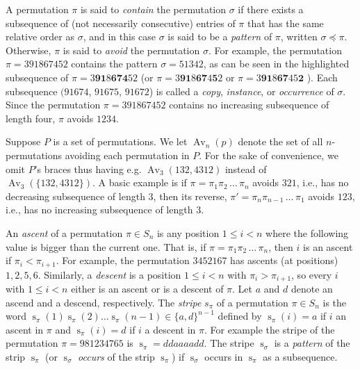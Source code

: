 \documentclass[a4paper]{llncs}
\DeclareMathOperator{\AV}{Av}
\DeclareMathOperator{\stripea}{s}
\newcommand{\stripe}[2]{\stripea_{{#1}}({#2})}
\newcommand{\stripew}[1]{\stripea_{{#1}}}
\newcommand{\dstep}{d}
\newcommand{\ustep}{a}
\begin{document}
A permutation $\pi$ is said to \emph{contain} the permutation $\sigma$ 
if there exists a subsequence of (not necessarily consecutive) 
entries of $\pi$ that has the same relative order as $\sigma$, 
and in this case $\sigma$ is said to be a \emph{pattern} of 
$\pi$, written $\sigma \preceq \pi$. 
Otherwise, $\pi$ is said to \emph{avoid} the permutation $\sigma$. 
For example, the permutation $\pi = 391867452$ 
contains the pattern $\sigma = 51342$, 
as can be seen in the highlighted subsequence of 
$\pi = 3\mathbf{9}\mathbf{1}8\mathbf{6}\mathbf{7}\mathbf{4}52$
(or 
$\pi = 3\mathbf{9}\mathbf{1}8\mathbf{6}\mathbf{7}4\mathbf{5}2$
or
$\pi = 3\mathbf{9}\mathbf{1}8\mathbf{6}\mathbf{7}45\mathbf{2}$
). 
Each subsequence $(91674$, 
$91675$, 
$91672$) is called a 
\emph{copy}, 
\emph{instance}, or 
\emph{occurrence} of $\sigma$. 
Since the permutation $\pi = 391867452$  contains no increasing subsequence of length four, $\pi$ avoids $1234$.

Suppose $P$ is a set of permutations. We let $\AV_n(p)$ denote the
set of all $n$-permutations avoiding each permutation in $P$.
For the sake of convenience, we omit $P$'s braces thus having
e.g. $\AV_3(132,4312)$ instead of
$\AV_3(\{132,4312\})$.
A basic example is if 
$\pi = \pi_1\pi_2\,\ldots\,\pi_n$ avoids $321$, i.e., 
has no decreasing subsequence of length $3$, then its reverse, 
$\pi' = \pi_n\pi_{n-1}\,\ldots\,\pi_1$ avoids $123$, i.e., 
has no increasing subsequence of length $3$.

An \emph{ascent} of a permutation $\pi \in S_n$ is any position 
$1 \leq i < n$ where the following value is bigger than the current one. 
That is, if $\pi = \pi_1\pi_2\,\ldots\,\pi_n$, then
$i$ is an ascent if $\pi_i < \pi_{i+1}$.
For example, the permutation 
$345216$7 has ascents (at positions) $1,2,5,6$.
Similarly, a \emph{descent} is a position 
$1 \leq i < n$ with $\pi_i > \pi_{i+1}$, 
so every $i$ with $1 \leq i < n$ either is an ascent or is a descent of 
$\pi$.
Let $\ustep$ and $\dstep$ denote an ascend and a descend, respectively.
The \emph{stripe} $s_\pi$ of a permutation $\pi \in S_n$ is the word
$\stripe{\pi}{1} \stripe{\pi}{2} \ldots \stripe{\pi}{n-1} \in \{\ustep,\dstep\}^{n-1}$ 
defined by 
$ \stripe{\pi}{i}= \ustep$ if $i$ an ascent in $\pi$ and
$\stripe{\pi}{i} = \dstep$ if $i$ a descent in $\pi$.
For example the stripe of the permutation 
$\pi = 981234765$
is $\stripew{\pi} = \dstep\dstep\ustep\ustep\ustep\ustep\dstep\dstep$.
The stripe $\stripew{\sigma}$ is a \emph{pattern} of the strip $\stripew{\pi}$
(or $\stripew{\sigma}$ \emph{occurs} of the strip $\stripew{\pi}$) if $\stripew{\sigma}$ occurs in
$\stripew{\pi}$ as a subsequence.
			
\end{document}
